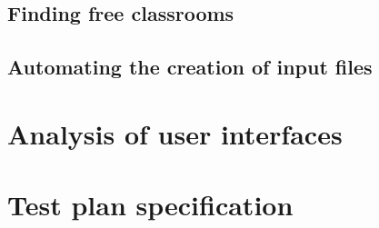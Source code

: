 \subsection{Finding free classrooms}
\subsection{Automating the creation of input files}



\section{Analysis of user interfaces}



\section{Test plan specification}

